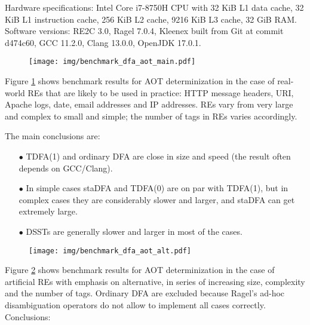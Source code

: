 \documentclass[]{article}
\begin{document}
Hardware specifications:
Intel Core i7-8750H CPU with
32 KiB L1 data cache,
32 KiB L1 instruction cache,
256 KiB L2 cache,
9216 KiB L3 cache,
32 GiB RAM.
%
Software versions:
RE2C 3.0,
Ragel 7.0.4,
Kleenex built from Git at commit d474c60,
GCC 11.2.0,
Clang 13.0.0,
OpenJDK 17.0.1.
\medskip

\pagebreak

\begin{figure}[t!]
\texttt{[image: img/benchmark\_dfa\_aot\_main.pdf]}
\label{fig:benchmark_dfa_aot_main}
\medskip
\end{figure}

Figure \ref{fig:benchmark_dfa_aot_main} shows benchmark results for AOT determinization
in the case of real-world REs that are likely to be used in practice:
HTTP message headers, URI, Apache logs, date, email addresses and IP addresses.
REs vary from very large and complex to small and simple;
the number of tags in REs varies accordingly.
\medskip

The main conclusions are:
\medskip

\begin{itemize}

\item[$\bullet$]
TDFA(1) and ordinary DFA are close in size and speed (the result often depends on GCC/Clang).
\medskip

\item[$\bullet$]
In simple cases staDFA and TDFA(0) are on par with TDFA(1),
but in complex cases they are considerably slower and larger,
and staDFA can get extremely large.
\medskip

\item[$\bullet$]
DSSTs are generally slower and larger in most of the cases.

\end{itemize}

\pagebreak

\begin{figure}[t!]
\texttt{[image: img/benchmark\_dfa\_aot\_alt.pdf]}
\label{fig:benchmark_dfa_aot_alt}
\medskip
\end{figure}

Figure \ref{fig:benchmark_dfa_aot_alt} shows benchmark results for AOT determinization
in the case of artificial REs with emphasis on alternative, in series of increasing size, complexity and the number of tags.
Ordinary DFA are excluded because Ragel's ad-hoc disambiguation operators do not allow to implement all cases correctly.
Conclusions:
\medskip
\end{document}
